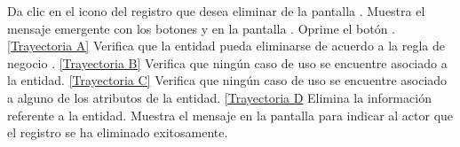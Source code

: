 	\begin{UCtrayectoria}
		\UCpaso[\UCactor] Da clic en el icono \eliminar del registro que desea eliminar de la pantalla .
		\UCpaso[\UCsist] Muestra el mensaje emergente  con los botones  y  en la pantalla .
		\UCpaso[\UCactor] Oprime el botón . \hyperlink{CU7-3:TAA}{[Trayectoria A]}
		\UCpaso[\UCsist] Verifica que la entidad pueda eliminarse de acuerdo a la regla de negocio . \hyperlink{CU7-3:TAB}{[Trayectoria B]}
		\UCpaso[\UCsist] Verifica que ningún caso de uso se encuentre asociado a la entidad. \hyperlink{CU7-3:TAC}{[Trayectoria C]}
		\UCpaso[\UCsist] Verifica que ningún caso de uso se encuentre asociado a alguno de los atributos de la entidad. \hyperlink{CU7-3:TAD}{[Trayectoria D}
		\UCpaso[\UCsist] Elimina la información referente a la entidad.
		\UCpaso[\UCsist] Muestra el mensaje  en la pantalla  para indicar al actor que el registro se ha eliminado exitosamente.
	\end{UCtrayectoria}


